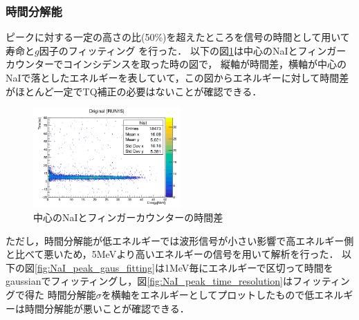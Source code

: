 
\subsubsection{時間分解能}
ピークに対する一定の高さの比(50\%)を超えたところを信号の時間として用いて寿命と$g$因子のフィッティング
を行った．
以下の図\ref{fig:Original}は中心のNaIとフィンガーカウンターでコインシデンスを取った時の図で， 縦軸が時間差，横軸が中心のNaIで落としたエネルギーを表していて，この図からエネルギーに対して時間差がほとんど一定でTQ補正の必要はないことが確認できる．

\begin{figure}[H]%
  \centering
  \includegraphics[width  = 0.5\textwidth]{figure/mino/Original.png}
  \caption{中心のNaIとフィンガーカウンターの時間差}
  \label{fig:Original}
\end{figure}

ただし，時間分解能が低エネルギーでは波形信号が小さい影響で高エネルギー側と比べて悪いため，5MeVより高いエネルギーの信号を用いて解析を行った．
以下の図\ref{fig:NaI_peak_gaus_fitting}は1MeV毎にエネルギーで区切って時間を
gaussianでフィッティングし，図\ref{fig:NaI_peak_time_resolution}はフィッティングで得た
時間分解能$\sigma$を横軸をエネルギーとしてプロットしたもので低エネルギーは時間分解能が悪いことが確認できる．


